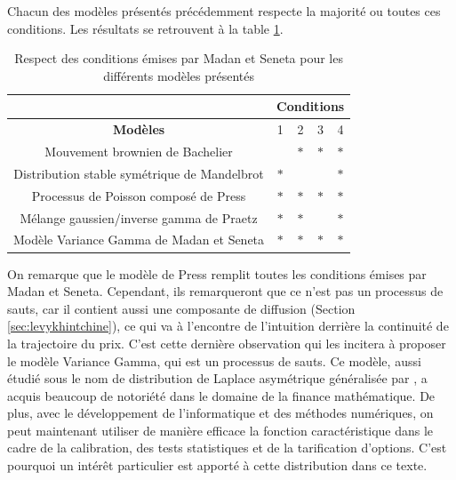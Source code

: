 Chacun des modèles présentés précédemment respecte la majorité ou
toutes ces conditions. Les résultats se retrouvent à la table
\ref{tab:condmadan}.
\begin{table}[!ht]
  \centering
  \begin{tabular}{ccccc}
    & \multicolumn{4}{c}{\textbf{Conditions}} \\
    \hline
    \textbf{Modèles}                                       & 1 & 2 & 3 & 4 \\
    \hline
    Mouvement brownien de Bachelier              &   & $\ast$ & $\ast$ & $\ast$ \\
    Distribution stable symétrique de Mandelbrot & $\ast$ & & & $\ast$ \\
    Processus de Poisson composé de Press       & $\ast$ & $\ast$ & $\ast$ & $\ast$ \\
    Mélange gaussien/inverse gamma de Praetz     & $\ast$ & $\ast$ &   & $\ast$ \\
    Modèle Variance Gamma de Madan et Seneta     & $\ast$ & $\ast$ & $\ast$ & $\ast$ \\
    \hline
  \end{tabular}
  \caption{Respect des conditions émises par Madan et Seneta pour les différents modèles présentés}
  \label{tab:condmadan}
\end{table}

On remarque que le modèle de Press remplit toutes les conditions
émises par Madan et Seneta. Cependant, ils remarqueront que ce n'est
pas un processus de sauts, car il contient aussi une composante de
diffusion (Section \ref{sec:levykhintchine}), ce qui va à l'encontre
de l'intuition derrière la continuité de la trajectoire du prix. C'est
cette dernière observation qui les incitera à proposer le modèle
Variance Gamma, qui est un processus de sauts. Ce modèle, aussi étudié
sous le nom de distribution de Laplace asymétrique généralisée par
\cite{kotz2001laplace}, a acquis beaucoup de notoriété dans le domaine
de la finance mathématique. De plus, avec le développement de
l'informatique et des méthodes numériques, on peut maintenant utiliser
de manière efficace la fonction caractéristique dans le cadre de la
calibration, des tests statistiques et de la tarification
d'options. C'est pourquoi un intérêt particulier est apporté à cette
distribution dans ce texte.


